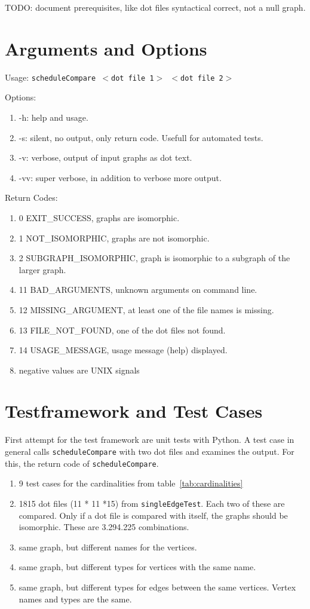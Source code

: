 \documentclass[12pt,a4paper]{report}
\begin{document}
TODO: document prerequisites, like dot files syntactical correct, not a null graph.
\chapter{Arguments and Options}
Usage: \texttt{scheduleCompare $<$dot file 1$>$ $<$dot file 2$>$}

Options:
\begin{enumerate}
	\item -h: help and usage.
	\item -s: silent, no output, only return code. Usefull for automated tests.
	\item -v: verbose, output of input graphs as dot text.
	\item -vv: super verbose, in addition to verbose more output.
\end{enumerate}

Return Codes:
\begin{enumerate}
	\item 0 EXIT\_SUCCESS, graphs are isomorphic.
	\item 1 NOT\_ISOMORPHIC, graphs are not isomorphic.
	\item 2 SUBGRAPH\_ISOMORPHIC, graph is isomorphic to a subgraph of the larger graph.
	\item 11 BAD\_ARGUMENTS, unknown arguments on command line.
	\item 12 MISSING\_ARGUMENT, at least one of the file names is missing.
	\item 13 FILE\_NOT\_FOUND, one of the dot files not found.
	\item 14 USAGE\_MESSAGE, usage message (help) displayed.
	\item negative values are UNIX signals
\end{enumerate}

\chapter{Testframework and Test Cases}
First attempt for the test framework are unit tests with Python. A test case in general calls \texttt{scheduleCompare} with two dot files and examines the output. For this, the return code of \texttt{scheduleCompare}.

\begin{enumerate}
	\item 9 test cases for the cardinalities from table~\ref{tab:cardinalities}
	\item 1815 dot files (11 * 11 *15) from \texttt{singleEdgeTest}. Each two of these are compared. Only if a dot file is compared with itself, the graphs should be isomorphic. These are 3.294.225 combinations.
	\item same graph, but different names for the vertices.
	\item same graph, but different types for vertices with the same name.
	\item same graph, but different types for edges between the same vertices. Vertex names and types are the same.
\end{enumerate}
\end{document}
